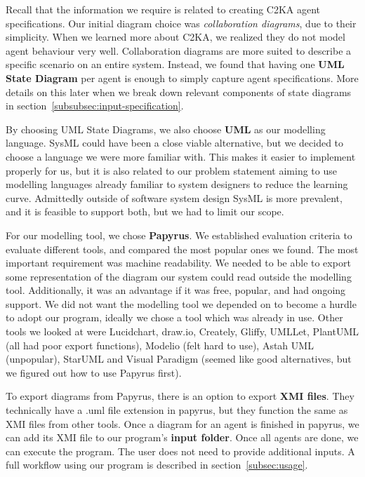 Recall that the information we require is related to creating C2KA agent specifications.
Our initial diagram choice was \textit{collaboration diagrams}, due to their simplicity.
When we learned more about C2KA, we realized they do not model agent behaviour very well.
Collaboration diagrams are more suited to describe a specific scenario on an entire system.
Instead, we found that having one \textbf{UML State Diagram} per agent is enough to simply capture agent specifications.
More details on this later when we break down relevant components of state diagrams in section~\ref{subsubsec:input-specification}.

By choosing UML State Diagrams, we also choose \textbf{UML} as our modelling language.
SysML could have been a close viable alternative, but we decided to choose a language we were more familiar with.
This makes it easier to implement properly for us,
but it is also related to our problem statement aiming to use modelling languages already familiar to system designers to reduce the learning curve.
Admittedly outside of software system design SysML is more prevalent, and it is feasible to support both, but we had to limit our scope.

For our modelling tool, we chose \textbf{Papyrus}.
We established evaluation criteria to evaluate different tools, and compared the most popular ones we found.
The most important requirement was machine readability.
We needed to be able to export some representation of the diagram our system could read outside the modelling tool.
Additionally, it was an advantage if it was free, popular, and had ongoing support.
We did not want the modelling tool we depended on to become a hurdle to adopt our program,
ideally we chose a tool which was already in use.
Other tools we looked at were Lucidchart, draw.io, Creately, Gliffy, UMLLet, PlantUML (all had poor export functions),
Modelio (felt hard to use), Astah UML (unpopular),
StarUML and Visual Paradigm (seemed like good alternatives, but we figured out how to use Papyrus first).

To export diagrams from Papyrus, there is an option to export \textbf{XMI files}.
They technically have a .uml file extension in papyrus, but they function the same as XMI files from other tools.
Once a diagram for an agent is finished in papyrus, we can add its XMI file to our program's \textbf{input folder}.
Once all agents are done, we can execute the program.
The user does not need to provide additional inputs.
A full workflow using our program is described in section~\ref{subsec:usage}.

